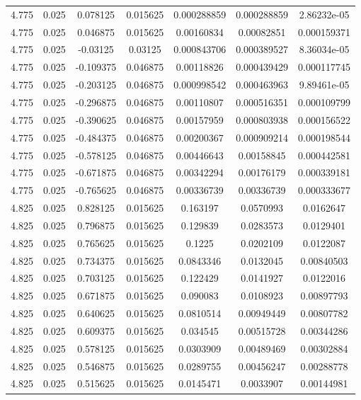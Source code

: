 \begin{flushleft}
\begin{longtable}{ccccccc}
4.775 & 0.025 & 0.078125 & 0.015625 & 0.000288859 & 0.000288859 & 2.86232e-05  \\ 
4.775 & 0.025 & 0.046875 & 0.015625 & 0.00160834 & 0.00082851 & 0.000159371  \\ 
4.775 & 0.025 & -0.03125 & 0.03125 & 0.000843706 & 0.000389527 & 8.36034e-05  \\ 
4.775 & 0.025 & -0.109375 & 0.046875 & 0.00118826 & 0.000439429 & 0.000117745  \\ 
4.775 & 0.025 & -0.203125 & 0.046875 & 0.000998542 & 0.000463963 & 9.89461e-05  \\ 
4.775 & 0.025 & -0.296875 & 0.046875 & 0.00110807 & 0.000516351 & 0.000109799  \\ 
4.775 & 0.025 & -0.390625 & 0.046875 & 0.00157959 & 0.000803938 & 0.000156522  \\ 
4.775 & 0.025 & -0.484375 & 0.046875 & 0.00200367 & 0.000909214 & 0.000198544  \\ 
4.775 & 0.025 & -0.578125 & 0.046875 & 0.00446643 & 0.00158845 & 0.000442581  \\ 
4.775 & 0.025 & -0.671875 & 0.046875 & 0.00342294 & 0.00176179 & 0.000339181  \\ 
4.775 & 0.025 & -0.765625 & 0.046875 & 0.00336739 & 0.00336739 & 0.000333677  \\ 
4.825 & 0.025 & 0.828125 & 0.015625 & 0.163197 & 0.0570993 & 0.0162647  \\ 
4.825 & 0.025 & 0.796875 & 0.015625 & 0.129839 & 0.0283573 & 0.0129401  \\ 
4.825 & 0.025 & 0.765625 & 0.015625 & 0.1225 & 0.0202109 & 0.0122087  \\ 
4.825 & 0.025 & 0.734375 & 0.015625 & 0.0843346 & 0.0132045 & 0.00840503  \\ 
4.825 & 0.025 & 0.703125 & 0.015625 & 0.122429 & 0.0141927 & 0.0122016  \\ 
4.825 & 0.025 & 0.671875 & 0.015625 & 0.090083 & 0.0108923 & 0.00897793  \\ 
4.825 & 0.025 & 0.640625 & 0.015625 & 0.0810514 & 0.00949449 & 0.00807782  \\ 
4.825 & 0.025 & 0.609375 & 0.015625 & 0.034545 & 0.00515728 & 0.00344286  \\ 
4.825 & 0.025 & 0.578125 & 0.015625 & 0.0303909 & 0.00489469 & 0.00302884  \\ 
4.825 & 0.025 & 0.546875 & 0.015625 & 0.0289755 & 0.00456247 & 0.00288778  \\ 
4.825 & 0.025 & 0.515625 & 0.015625 & 0.0145471 & 0.0033907 & 0.00144981  \\ 

\end{longtable}
\end{flushleft}
